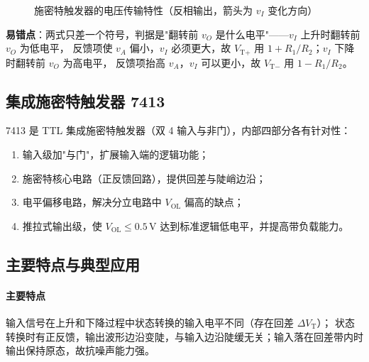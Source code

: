 \begin{figure}[htbp]
\centering
{}
\caption{施密特触发器的电压传输特性（反相输出，箭头为 $v_I$ 变化方向）}
\end{figure}

\textbf{易错点}：两式只差一个符号，判据是"翻转前 $v_O$ 是什么电平"——$v_I$ 上升时翻转前 $v_O$ 为低电平，
反馈项使 $v_A$ 偏小，$v_I$ 必须更大，故 $V_{\text{T}+}$ 用 $1+R_1/R_2$；$v_I$ 下降时翻转前 $v_O$ 为高电平，
反馈项抬高 $v_A$，$v_I$ 可以更小，故 $V_{\text{T}-}$ 用 $1-R_1/R_2$。

\subsection{集成施密特触发器 7413}
7413 是 TTL 集成施密特触发器（双 4 输入与非门），内部四部分各有针对性：
\begin{enumerate}
    \item 输入级加"与门"，扩展输入端的逻辑功能；
    \item 施密特核心电路（正反馈回路），提供回差与陡峭边沿；
    \item 电平偏移电路，解决分立电路中 $V_\text{OL}$ 偏高的缺点；
    \item 推拉式输出级，使 $V_\text{OL}\le0.5\,\mathrm{V}$ 达到标准逻辑低电平，并提高带负载能力。
\end{enumerate}

\subsection{主要特点与典型应用}
\paragraph{主要特点}
输入信号在上升和下降过程中状态转换的输入电平不同（存在回差 $\Delta V_\text{T}$）；
状态转换时有正反馈，输出波形边沿变陡，与输入边沿陡缓无关；输入落在回差带内时输出保持原态，故抗噪声能力强。

